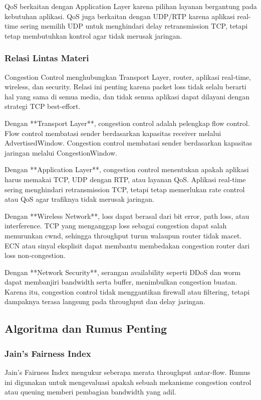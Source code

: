 QoS berkaitan dengan Application Layer karena pilihan layanan bergantung pada kebutuhan aplikasi. QoS juga berkaitan dengan UDP/RTP karena aplikasi real-time sering memilih UDP untuk menghindari delay retransmission TCP, tetapi tetap membutuhkan kontrol agar tidak merusak jaringan.

\subsubsection{Relasi Lintas Materi}
\begin{jawab}
Congestion Control menghubungkan Transport Layer, router, aplikasi real-time, wireless, dan security. Relasi ini penting karena packet loss tidak selalu berarti hal yang sama di semua media, dan tidak semua aplikasi dapat dilayani dengan strategi TCP best-effort.
\end{jawab}

Dengan **Transport Layer**, congestion control adalah pelengkap flow control. Flow control membatasi sender berdasarkan kapasitas receiver melalui AdvertisedWindow. Congestion control membatasi sender berdasarkan kapasitas jaringan melalui CongestionWindow.

Dengan **Application Layer**, congestion control menentukan apakah aplikasi harus memakai TCP, UDP dengan RTP, atau layanan QoS. Aplikasi real-time sering menghindari retransmission TCP, tetapi tetap memerlukan rate control atau QoS agar trafiknya tidak merusak jaringan.

Dengan **Wireless Network**, loss dapat berasal dari bit error, path loss, atau interference. TCP yang menganggap loss sebagai congestion dapat salah menurunkan cwnd, sehingga throughput turun walaupun router tidak macet. ECN atau sinyal eksplisit dapat membantu membedakan congestion router dari loss non-congestion.

Dengan **Network Security**, serangan availability seperti DDoS dan worm dapat membanjiri bandwidth serta buffer, menimbulkan congestion buatan. Karena itu, congestion control tidak menggantikan firewall atau filtering, tetapi dampaknya terasa langsung pada throughput dan delay jaringan.

\subsection{Algoritma dan Rumus Penting}

\subsubsection{Jain's Fairness Index}
\begin{jawab}
Jain's Fairness Index mengukur seberapa merata throughput antar-flow. Rumus ini digunakan untuk mengevaluasi apakah sebuah mekanisme congestion control atau queuing memberi pembagian bandwidth yang adil.
\end{jawab}


